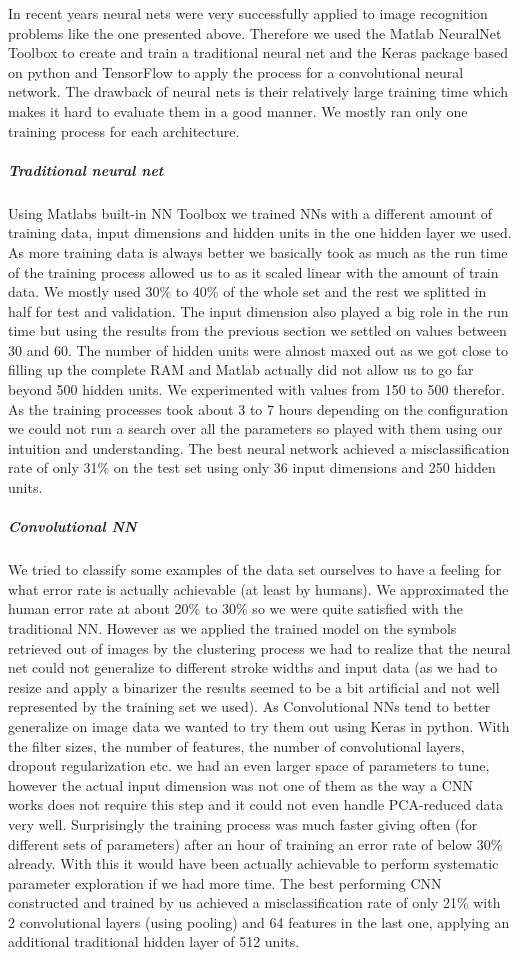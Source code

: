 \documentclass[twocolumn]{article}%
\begin{document}
	In recent years neural nets were very successfully applied to image recognition problems like the one presented above. Therefore we used the Matlab NeuralNet Toolbox to create and train a traditional neural net and the Keras package based on python and TensorFlow to apply the process for a convolutional neural network. The drawback of neural nets is their relatively large training time which makes it hard to evaluate them in a good manner. We mostly ran only one training process for each architecture.
	\subparagraph{Traditional neural net}
	Using Matlabs built-in NN Toolbox we trained NNs with a different amount of training data, input dimensions and hidden units in the one hidden layer we used. As more training data is always better we basically took as much as the run time of the training process allowed us to as it scaled linear with the amount of train data. We mostly used 30\% to 40\% of the whole set and the rest we splitted in half for test and validation. The input dimension also played a big role in the run time but using the results from the previous section we settled on values between 30 and 60. The number of hidden units were almost maxed out as we got close to filling up the complete RAM and Matlab actually did not allow us to go far beyond 500 hidden units. We experimented with values from 150 to 500 therefor. As the training processes took about 3 to 7 hours depending on the configuration we could not run a search over all the parameters so played with them using our intuition and understanding. The best neural network achieved a misclassification rate of only 31\% on the test set using only 36 input dimensions and 250 hidden units.
	\subparagraph{Convolutional NN}
	We tried to classify some examples of the data set ourselves to have a feeling for what error rate is actually achievable (at least by humans). We approximated the human error rate at about 20\% to 30\% so we were quite satisfied with the traditional NN. However as we applied the trained model on the symbols retrieved out of images by the clustering process we had to realize that the neural net could not generalize to different stroke widths and input data (as we had to resize and apply a binarizer the results seemed to be a bit artificial and not well represented by the training set we used). As Convolutional NNs tend to better generalize on image data \cite{lenet} we wanted to try them out using Keras \cite{keras} in python. With the filter sizes, the number of features, the number of convolutional layers, dropout regularization etc. we had an even larger space of parameters to tune, however the actual input dimension was not one of them as the way a CNN works does not require this step and it could not even handle PCA-reduced data very well. Surprisingly the training process was much faster giving often (for different sets of parameters) after an hour of training an error rate of below 30\% already. With this it would have been actually achievable to perform systematic parameter exploration if we had more time. The best performing CNN constructed and trained by us achieved a misclassification rate of only 21\% with 2 convolutional layers (using pooling) and 64 features in the last one, applying an additional traditional hidden layer of 512 units.
\end{document}
